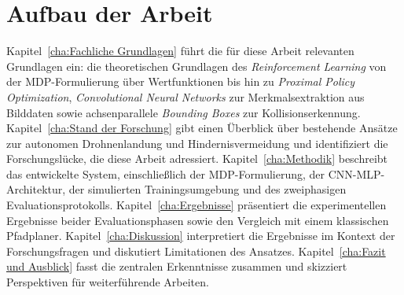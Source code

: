 \section{Aufbau der Arbeit}

Kapitel~\ref{cha:Fachliche Grundlagen} führt die für diese Arbeit relevanten Grundlagen ein: die theoretischen Grundlagen des \textit{Reinforcement Learning} von der MDP-Formulierung über Wertfunktionen bis hin zu \textit{Proximal Policy Optimization}, \textit{Convolutional Neural Networks} zur Merkmalsextraktion aus Bilddaten sowie achsenparallele \textit{Bounding Boxes} zur Kollisionserkennung. Kapitel~\ref{cha:Stand der Forschung} gibt einen Überblick über bestehende Ansätze zur autonomen Drohnenlandung und Hindernisvermeidung und identifiziert die Forschungslücke, die diese Arbeit adressiert. Kapitel~\ref{cha:Methodik} beschreibt das entwickelte System, einschließlich der MDP-Formulierung, der CNN-MLP-Architektur, der simulierten Trainingsumgebung und des zweiphasigen Evaluationsprotokolls. Kapitel~\ref{cha:Ergebnisse} präsentiert die experimentellen Ergebnisse beider Evaluationsphasen sowie den Vergleich mit einem klassischen Pfadplaner. Kapitel~\ref{cha:Diskussion} interpretiert die Ergebnisse im Kontext der Forschungsfragen und diskutiert Limitationen des Ansatzes. Kapitel~\ref{cha:Fazit und Ausblick} fasst die zentralen Erkenntnisse zusammen und skizziert Perspektiven für weiterführende Arbeiten.
